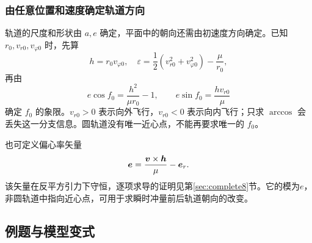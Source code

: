 \subsubsection{由任意位置和速度确定轨道方向}

轨道的尺度和形状由 $a,e$ 确定，平面中的朝向还需由初速度方向确定。已知 $r_0,v_{r0},v_{\varphi0}$ 时，先算
\[
 h=r_0v_{\varphi0},\quad
 \varepsilon=\frac12(v_{r0}^2+v_{\varphi0}^2)-\frac{\mu}{r_0},
\]
再由
\begin{equation}\label{sup8:eq:d8-initial-angle}
 e\cos f_0=\frac{h^2}{\mu r_0}-1,\qquad
 e\sin f_0=\frac{hv_{r0}}{\mu}
\end{equation}
确定 $f_0$ 的象限。$v_{r0}>0$ 表示向外飞行，$v_{r0}<0$ 表示向内飞行；只求 $\arccos$ 会丢失这一分支信息。圆轨道没有唯一近心点，不能再要求唯一的 $f_0$。

也可定义偏心率矢量
\begin{equation}
 \bm{e}=\frac{\bm{v}\times\bm{h}}{\mu}-\bm{e}_r.
\end{equation}
该矢量在反平方引力下守恒，逐项求导的证明见第\ref{sec:complete8}节。它的模为$e$，非圆轨道中指向近心点，可用于求瞬时冲量前后轨道朝向的改变。


\subsection{例题与模型变式}

